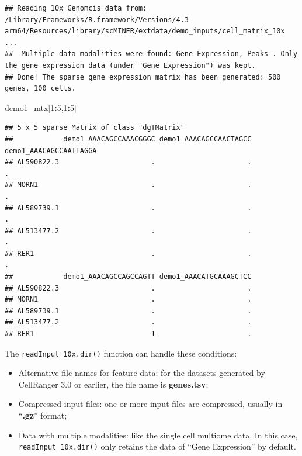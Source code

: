 \documentclass[
  12pt,
]{book}
\newenvironment{Shaded}{\begin{snugshade}}{\end{snugshade}}
\newcommand{\DecValTok}[1]{\textcolor[rgb]{0.00,0.00,0.81}{#1}}
\newcommand{\NormalTok}[1]{#1}
\newcommand{\SpecialCharTok}[1]{\textcolor[rgb]{0.81,0.36,0.00}{\textbf{#1}}}
\providecommand{\tightlist}{%
  \setlength{\itemsep}{0pt}\setlength{\parskip}{0pt}}
\begin{document}
\begin{verbatim}
## Reading 10x Genomcis data from: /Library/Frameworks/R.framework/Versions/4.3-arm64/Resources/library/scMINER/extdata/demo_inputs/cell_matrix_10x ...
##  Multiple data modalities were found: Gene Expression, Peaks . Only the gene expression data (under "Gene Expression") was kept.
## Done! The sparse gene expression matrix has been generated: 500 genes, 100 cells.
\end{verbatim}

\begin{Shaded}
\begin{Highlighting}[]
\NormalTok{demo1\_mtx[}\DecValTok{1}\SpecialCharTok{:}\DecValTok{5}\NormalTok{,}\DecValTok{1}\SpecialCharTok{:}\DecValTok{5}\NormalTok{]}
\end{Highlighting}
\end{Shaded}

\begin{verbatim}
## 5 x 5 sparse Matrix of class "dgTMatrix"
##            demo1_AAACAGCCAAACGGGC demo1_AAACAGCCAACTAGCC demo1_AAACAGCCAATTAGGA
## AL590822.3                      .                      .                      .
## MORN1                           .                      .                      .
## AL589739.1                      .                      .                      .
## AL513477.2                      .                      .                      .
## RER1                            .                      .                      .
##            demo1_AAACAGCCAGCCAGTT demo1_AAACATGCAAAGCTCC
## AL590822.3                      .                      .
## MORN1                           .                      .
## AL589739.1                      .                      .
## AL513477.2                      .                      .
## RER1                            1                      .
\end{verbatim}

The \texttt{readInput\_10x.dir()} function can handle these conditions:

\begin{itemize}
\tightlist
\item
  Alternative file names for feature data: for the datasets generated by CellRanger 3.0 or earlier, the file name is \textbf{genes.tsv};
\item
  Compressed input files: one or more input files are compressed, usually in ``\textbf{.gz}'' format;
\item
  Data with multiple modalities: like the single cell multiome data. In this case, \texttt{readInput\_10x.dir()} only retains the data of ``Gene Expression'' by default.
\end{itemize}
\end{document}
